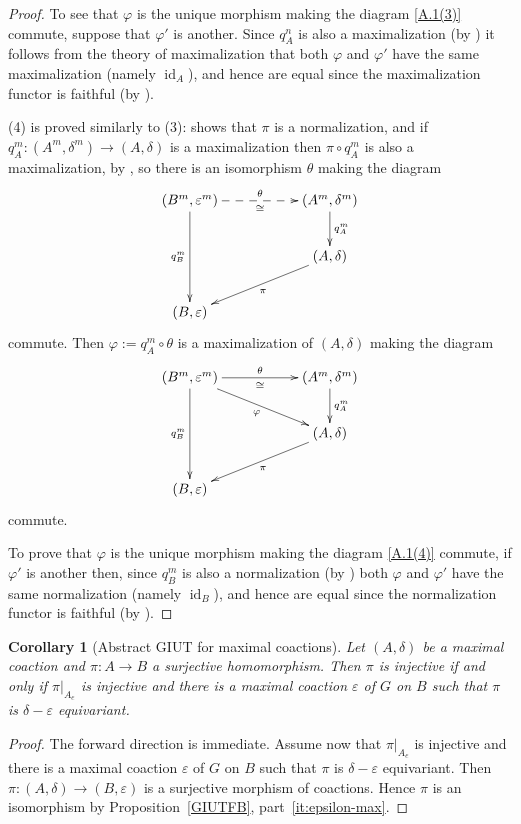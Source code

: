 \documentclass[12pt]{amsart}
\theoremstyle{plain}
\newtheorem{cor}[theorem]{Corollary}
\theoremstyle{remark}
\theoremstyle{definition}
\numberwithin{equation}{section}
\theoremstyle{plain}
\theoremstyle{definition}
\theoremstyle{remark}
\begin{document}
\begin{proof}
To see that $\varphi$ is the unique morphism making the diagram \eqref{A.1(3)} commute, suppose that $\varphi'$ is another. Since $q_A^n$ is also a maximalization (by \cite[Proposition~6.1.15]{BKQ}) it follows from the theory of maximalization that both $\varphi$ and $\varphi'$ have the same maximalization (namely ${\operatorname{id}}_A$), and hence are equal since the maximalization functor is faithful (by \cite[Corollary~6.1.19]{BKQ}).

(4) is proved similarly to (3): \cite[Proposition~6.1.7]{BKQ} shows that $\pi$ is a normalization, and if $q^m_A:(A^m,\delta^m)\to (A,\delta)$ is a maximalization then $\pi\circ q^m_A$ is also a maximalization, by \cite[Proposition~6.1.11]{BKQ}, so there is an isomorphism $\theta$ making the diagram
\[
\xymatrix@C+30pt{
(B^m,\varepsilon^m) \ar[dd]_{q_B^m} \ar@{-->}[r]^-\theta_-{\cong}
&(A^m,\delta^m) \ar[d]^{q^m_A}
\\
&(A,\delta) \ar[dl]^\pi
\\
(B,\varepsilon)
}
\]
commute.
Then $\varphi:=q^m_A\circ\theta$ is a maximalization of $(A,\delta)$ making the diagram
\[
\xymatrix@C+30pt{
(B^m,\varepsilon^m) \ar[dd]_{q_B^m} \ar[r]^-\theta_-{\cong} \ar[dr]_\varphi
&(A^m,\delta^m) \ar[d]^{q^m_A}
\\
&(A,\delta) \ar[dl]^\pi
\\
(B,\varepsilon)
}
\]
commute.

To prove that $\varphi$ is the unique morphism making the diagram \eqref{A.1(4)} commute, if $\varphi'$ is another then, since $q_B^m$ is also a normalization (by \cite[Proposition~6.1.14]{BKQ}) both $\varphi$ and $\varphi'$ have the same normalization (namely ${\operatorname{id}}_B$), and hence are equal since the normalization functor is faithful (by \cite[Corollary~6.1.19]{BKQ}).
\end{proof}

\begin{cor}[Abstract GIUT for maximal coactions]
\label{cor:giut-max-coact} Let $(A, \delta)$ be a maximal coaction and
$\pi:A\to B$  a surjective homomorphism. Then $\pi$ is
injective if and only if $\pi\vert_{A_e}$ is injective and there is a maximal
coaction $\varepsilon$ of $G$ on $B$ such that $\pi$ is $\delta-\varepsilon$ equivariant.
\end{cor}

\begin{proof} The forward direction is immediate. Assume now that $\pi\vert_{A_e}$ is injective
and there is a maximal coaction $\varepsilon$ of $G$ on $B$ such that $\pi$ is $\delta-\varepsilon$ equivariant.
Then $\pi: (A, \delta)\to (B, \varepsilon)$ is a surjective morphism of coactions. Hence $\pi$
is an isomorphism by Proposition~\ref{GIUTFB}, part~\eqref{it:epsilon-max}.
\end{proof}
\end{document}
